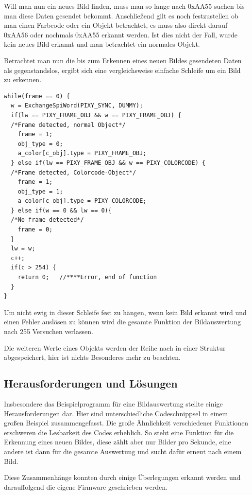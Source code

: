     Will man nun ein neues Bild finden, muss man so lange nach 0xAA55 suchen bis man diese Daten gesendet bekommt.
    Anschließend gilt es noch festzustellen ob man einen Farbcode oder ein Objekt betrachtet,
    es muss also direkt darauf 0xAA56 oder nochmals 0xAA55 erkannt werden. Ist dies nicht der Fall, wurde kein neues Bild erkannt und man betrachtet ein normales Objekt.

    Betrachtet man nun die bis zum Erkennen eines neuen Bildes gesendeten Daten als gegenstandslos, ergibt sich eine vergleichsweise einfache Schleife um ein Bild zu erkennen.

    \lstset{language = c}
    \begin{lstlisting}
while(frame == 0) {
  w = ExchangeSpiWord(PIXY_SYNC, DUMMY);
  if(lw == PIXY_FRAME_OBJ && w == PIXY_FRAME_OBJ) {
  /*Frame detected, normal Object*/
    frame = 1;
    obj_type = 0;
    a_color[c_obj].type = PIXY_FRAME_OBJ;
  } else if(lw == PIXY_FRAME_OBJ && w == PIXY_COLORCODE) {
  /*Frame detected, Colorcode-Object*/
    frame = 1;
    obj_type = 1;
    a_color[c_obj].type = PIXY_COLORCODE;
  } else if(w == 0 && lw == 0){
  /*No frame detected*/
    frame = 0;
  }
  lw = w;
  c++;
  if(c > 254) {
    return 0;	//****Error, end of function
  }
}
    \end{lstlisting}
    Um nicht ewig in dieser Schleife fest zu hängen, wenn kein Bild erkannt wird und einen Fehler auslösen zu können wird die gesamte Funktion der Bildauswertung
    nach 255 Versuchen verlassen.

    Die weiteren Werte eines Objekts werden der Reihe nach in einer \gls{Struktur} abgespeichert, hier ist nichts Besonderes mehr zu beachten.

  \subsection{Herausforderungen und Lösungen}
  Insbesondere das Beispielprogramm\cite{PIXY_Porting_Examplecode} für eine Bildauswertung stellte einige Herausforderungen dar. Hier sind unterschiedliche Codeschnippsel in einem
  großen Beispiel zusammengefasst. Die große Ähnlichkeit verschiedener Funktionen erschweren die Lesbarkeit des Codes erheblich. So steht eine Funktion für die Erkennung eines
  neuen Bildes, diese zählt aber nur Bilder pro Sekunde, eine andere ist dann für die gesamte Auswertung und sucht dafür erneut nach einem Bild.

  Diese Zusammenhänge konnten durch einige Überlegungen erkannt werden und darauffolgend die eigene Firmware geschrieben werden.

